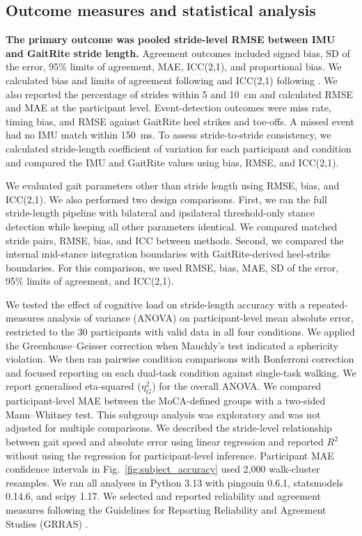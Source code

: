 \documentclass[11pt]{article}
\begin{document}
\subsection{Outcome measures and statistical analysis}\label{sec:outcomes}

\textbf{The primary outcome was pooled stride-level RMSE between IMU and GaitRite stride length.} Agreement outcomes included signed bias, SD of the error, 95\% limits of agreement, MAE, ICC(2,1), and proportional bias. We calculated bias and limits of agreement following \citet{Bland1986} and ICC(2,1) following \citet{Shrout1979}. We also reported the percentage of strides within 5 and 10~cm and calculated RMSE and MAE at the participant level. Event-detection outcomes were miss rate, timing bias, and RMSE against GaitRite heel strikes and toe-offs. A missed event had no IMU match within 150~ms. To assess stride-to-stride consistency, we calculated stride-length coefficient of variation for each participant and condition and compared the IMU and GaitRite values using bias, RMSE, and ICC(2,1).

We evaluated gait parameters other than stride length using RMSE, bias, and ICC(2,1). We also performed two design comparisons. First, we ran the full stride-length pipeline with bilateral and ipsilateral threshold-only stance detection while keeping all other parameters identical. We compared matched stride pairs, RMSE, bias, and ICC between methods. Second, we compared the internal mid-stance integration boundaries with GaitRite-derived heel-strike boundaries. For this comparison, we used RMSE, bias, MAE, SD of the error, 95\% limits of agreement, and ICC(2,1).

We tested the effect of cognitive load on stride-length accuracy with a repeated-measures analysis of variance (ANOVA) on participant-level mean absolute error, restricted to the 30 participants with valid data in all four conditions. We applied the Greenhouse--Geisser correction when Mauchly's test indicated a sphericity violation. We then ran pairwise condition comparisons with Bonferroni correction and focused reporting on each dual-task condition against single-task walking. We report generalised eta-squared ($\eta^2_G$) for the overall ANOVA. We compared participant-level MAE between the MoCA-defined groups with a two-sided Mann--Whitney test. This subgroup analysis was exploratory and was not adjusted for multiple comparisons. We described the stride-level relationship between gait speed and absolute error using linear regression and reported $R^2$ without using the regression for participant-level inference. Participant MAE confidence intervals in Fig.~\ref{fig:subject_accuracy} used 2{,}000 walk-cluster resamples. We ran all analyses in Python 3.13 with pingouin 0.6.1, statsmodels 0.14.6, and scipy 1.17. We selected and reported reliability and agreement measures following the Guidelines for Reporting Reliability and Agreement Studies (GRRAS) \citep{Kottner2011}.
\end{document}
